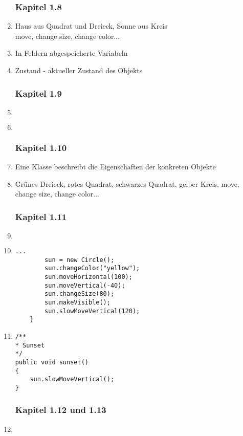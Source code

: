 \begin{enumerate}
\subsubsection{Kapitel 1.8}
\item Haus aus Quadrat und Dreieck, Sonne aus Kreis \\
      move, change size, change color...
\item In Feldern abgespeicherte Variabeln
\item Zustand - aktueller Zustand des Objekts

\subsubsection{Kapitel 1.9}
\item $~$
\item $~$

\subsubsection{Kapitel 1.10}
\item Eine Klasse beschreibt die Eigenschaften der konkreten Objekte
\item Grünes Dreieck, rotes Quadrat, schwarzes Quadrat, gelber Kreis, move, 
      change size, change color...

\subsubsection{Kapitel 1.11}
\item $~$
\item \begin{lstlisting}[caption=Aufgabe 1.18]
        ...
        sun = new Circle();
        sun.changeColor("yellow");
        sun.moveHorizontal(100);
        sun.moveVertical(-40);
        sun.changeSize(80);
        sun.makeVisible();
        sun.slowMoveVertical(120);
    }
\end{lstlisting}
\item 
\begin{lstlisting}[caption=Aufgabe 1.19]
/**
* Sunset
*/
public void sunset()
{
    sun.slowMoveVertical();
}
\end{lstlisting}

\subsubsection{Kapitel 1.12 und 1.13}
\item $~$


\end{enumerate}
